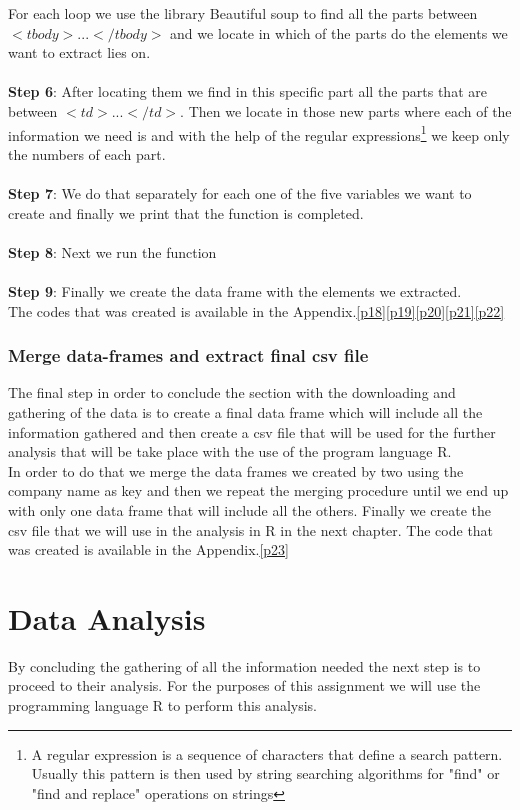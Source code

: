 \documentclass{book}
\begin{document}
For each loop we use the library Beautiful soup to find all the parts between $<tbody>...</tbody>$ and we locate in which of the parts do the elements we want to extract lies on.\\\\
\textbf{Step 6}: After locating them we find in this specific part all the parts that are between $<td>...</td>$. Then we locate in those new parts where each of the information we need is and with the help of the regular expressions\footnote{A regular expression is  a sequence of characters that define a search pattern. Usually this pattern is then used by string searching algorithms for "find" or "find and replace" operations on strings} we keep only the numbers of each part.\\\\\textbf{Step 7}: We do that separately for each one of the five variables we want to create and finally we print that the function is completed.\\\\
\textbf{Step 8}: Next we run the function\\\\
\textbf{Step 9}: Finally we create the data frame with the elements we extracted.\\
The codes that was created is available in the Appendix.\ref{p18}\ref{p19}\ref{p20}\ref{p21}\ref{p22} 

\subsection{Merge data-frames and extract final csv file}
The final step in order to conclude the section with the downloading and gathering of the data is to create a final data frame which will include all the information gathered and then create a csv file that will be used for the further analysis that will be take place with the use of the program language R.\\
In order to do that we merge the data frames we created by two using the company name as key and then we repeat the merging procedure until we end up with only one data frame that will include all the others.
Finally we create the csv file that we will use in the analysis in R in the next chapter. The code that was created is available in the Appendix.\ref{p23}
 
\chapter{Data Analysis}
By concluding the gathering of all the information needed the next step is to proceed to their analysis. For the purposes of this assignment we will use the programming language R to perform this analysis.\cite{key1}
\end{document}
